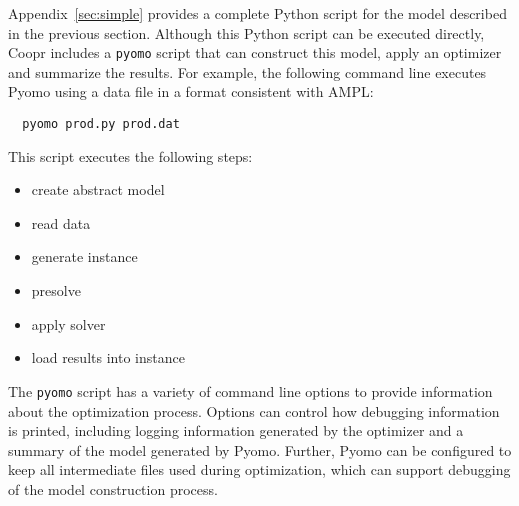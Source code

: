 Appendix~\ref{sec:simple} provides a complete Python script for the model described in the previous section.  Although this Python script can be executed directly, Coopr includes a {\tt pyomo} script that can construct this model, apply an optimizer and summarize the results.  For example, the following
command line executes Pyomo using a data file in a format consistent with AMPL:
\begin{lstlisting}
  pyomo prod.py prod.dat
\end{lstlisting}
This script executes the following steps:
\begin{itemize}
\item create abstract model
\item read data
\item generate instance
\item presolve
\item apply solver
\item load results into instance
\end{itemize}
The {\tt pyomo} script has a variety of command line options to provide information about the optimization process.  Options can control how debugging information is printed, including logging information generated by the optimizer and a summary of the model generated by Pyomo.  Further, Pyomo can be configured to keep all intermediate files used during optimization, which can support debugging of the model construction process.



